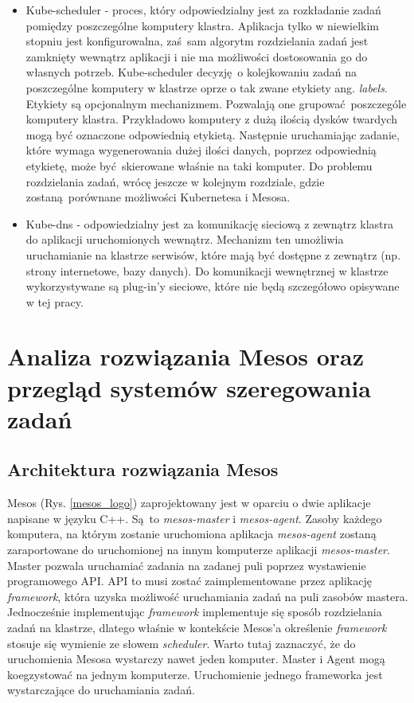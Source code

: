 \documentclass[10pt,a4paper,titlepage,twoside]{report}
\begin{document}
\begin{itemize}
\item Kube-scheduler - proces, który odpowiedzialny jest za rozkładanie zadań pomiędzy poszczególne komputery klastra. Aplikacja tylko w niewielkim stopniu jest konfigurowalna, zaś sam algorytm rozdzielania zadań jest zamknięty wewnątrz aplikacji i nie ma możliwości dostosowania go do własnych potrzeb. Kube-scheduler decyzję o kolejkowaniu zadań na poszczególne komputery w klastrze oprze o tak zwane etykiety ang. \textit{labels}. Etykiety są opcjonalnym mechanizmem. Pozwalają one grupować poszczególe komputery klastra. Przykładowo komputery z dużą ilością dysków twardych mogą być oznaczone odpowiednią etykietą. Następnie uruchamiając zadanie, które wymaga wygenerowania dużej ilości danych, poprzez odpowiednią etykietę, może być skierowane właśnie na taki komputer. Do problemu rozdzielania zadań, wrócę jeszcze w kolejnym rozdziale, gdzie zostaną porównane możliwości Kubernetesa i Mesosa.
\item Kube-dns - odpowiedzialny jest za komunikację sieciową z zewnątrz klastra do aplikacji uruchomionych wewnątrz. Mechanizm ten umożliwia uruchamianie na klastrze serwisów, które mają być dostępne z zewnątrz (np. strony internetowe, bazy danych). Do komunikacji wewnętrznej w klastrze wykorzystywane są plug-in'y sieciowe, które nie będą szczegółowo opisywane w tej pracy.
\end{itemize}

\onehalfspacing
\chapter{Analiza rozwiązania Mesos oraz przegląd systemów szeregowania zadań}

\section{Architektura rozwiązania Mesos}

Mesos (Rys. \ref{mesos_logo}) zaprojektowany jest w oparciu o dwie aplikacje napisane w języku C++. Są to \textit{mesos-master} i \textit{mesos-agent}. Zasoby każdego komputera, na którym zostanie uruchomiona aplikacja \textit{mesos-agent} zostaną zaraportowane do uruchomionej na innym komputerze aplikacji \textit{mesos-master}. Master pozwala uruchamiać zadania na zadanej puli poprzez wystawienie programowego API. API to musi zostać zaimplementowane przez aplikację \textit{framework}, która uzyska możliwość uruchamiania zadań na puli zasobów mastera. Jednocześnie implementując \textit{framework} implementuje się sposób rozdzielania zadań na klastrze, dlatego właśnie w kontekście Mesos'a określenie \textit{framework} stosuje się wymienie ze słowem \textit{scheduler}. Warto tutaj zaznaczyć, że do uruchomienia Mesosa wystarczy nawet jeden komputer. Master i Agent mogą koegzystować na jednym komputerze. Uruchomienie jednego frameworka jest wystarczające do uruchamiania zadań. 
\end{document}
